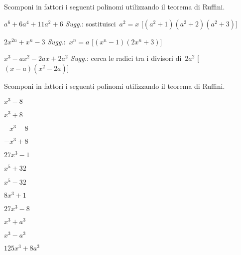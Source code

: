 \begin{esercizio}[\Ast]
\label{ese:17.15}
Scomponi in fattori i seguenti polinomi utilizzando il teorema di Ruffini.
 \begin{enumeratea}
\item $a^{6}+6a^{4}+11a^{2}+6$
  \quad \emph{Sugg.}: sostituisci~$a^{2}=x$
  \hfill [$(a^{2}+1)(a^{2}+2)(a^{2}+3)$]
\item $2x^{2n}+x^{n}-3$
  \quad \emph{Sugg.}:~$x^{n}=a$
  \hfill [$(x^{n}-1)(2x^{n}+3)$]
\item $x^{3}-ax^{2}-2ax+2a^{2}$
  \quad \emph{Sugg.}: cerca le radici tra i divisori di~$2a^{2}$
  \hfill [$(x-a)\left(x^{2}-2a\right)$]
 \end{enumeratea}
\end{esercizio}

\begin{esercizio}
\label{ese:17.11}
Scomponi in fattori i seguenti polinomi utilizzando il teorema di Ruffini.
\begin{multicols}{4}
 \begin{enumeratea}
\item $x^{3}-8$
\item $x^{3}+8$
\item $-x^{3}-8$
\item $-x^{3}+8$
\item $27x^{3}-1$
\item $x^{5}+32$
\item $x^{5}-32$
\item $8x^{3}+1$
\item $27x^{3}-8$
\item $x^{3}+a^{3}$
\item $x^{3}-a^{3}$
\item $125x^{3}+8a^{3}$
 \end{enumeratea}
\end{multicols}
\end{esercizio}

\subsubsection*{}

